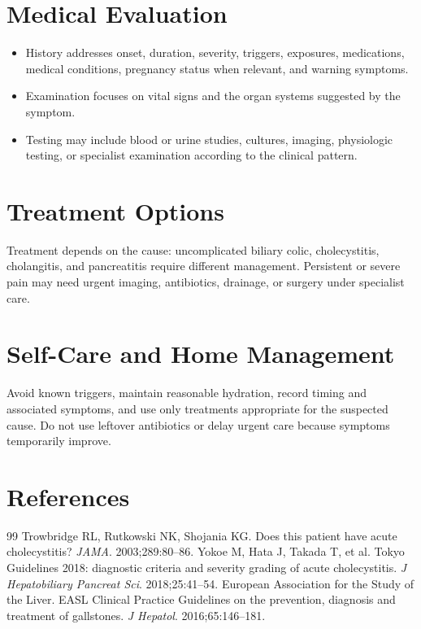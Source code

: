 \section*{Medical Evaluation}
\begin{itemize}
  \item History addresses onset, duration, severity, triggers, exposures, medications, medical conditions, pregnancy status when relevant, and warning symptoms.
  \item Examination focuses on vital signs and the organ systems suggested by the symptom.
  \item Testing may include blood or urine studies, cultures, imaging, physiologic testing, or specialist examination according to the clinical pattern.
\end{itemize}

\section*{Treatment Options}
Treatment depends on the cause: uncomplicated biliary colic, cholecystitis, cholangitis, and pancreatitis require different management. Persistent or severe pain may need urgent imaging, antibiotics, drainage, or surgery under specialist care.

\section*{Self-Care and Home Management}
Avoid known triggers, maintain reasonable hydration, record timing and associated symptoms, and use only treatments appropriate for the suspected cause. Do not use leftover antibiotics or delay urgent care because symptoms temporarily improve.

\section*{References}
\begin{thebibliography}{99}
 Trowbridge RL, Rutkowski NK, Shojania KG. Does this patient have acute cholecystitis? \textit{JAMA}. 2003;289:80--86.
 Yokoe M, Hata J, Takada T, et al. Tokyo Guidelines 2018: diagnostic criteria and severity grading of acute cholecystitis. \textit{J Hepatobiliary Pancreat Sci}. 2018;25:41--54.
 European Association for the Study of the Liver. EASL Clinical Practice Guidelines on the prevention, diagnosis and treatment of gallstones. \textit{J Hepatol}. 2016;65:146--181.
\end{thebibliography}
